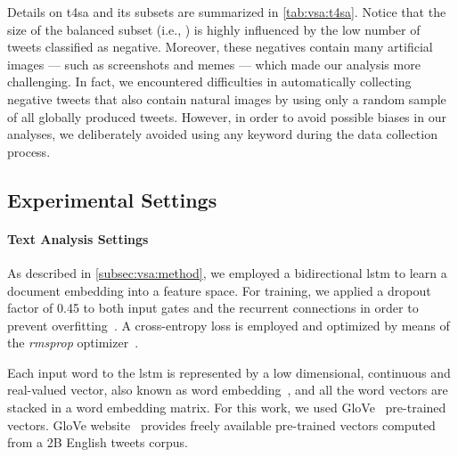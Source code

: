 Details on \gls{t4sa} and its subsets are summarized in \ref{tab:vsa:t4sa}.
Notice that the size of the balanced subset (i.e., {\BTSA}) is highly influenced by the low number of tweets classified as negative.
Moreover, these negatives contain many artificial images --- such as screenshots and memes --- which made our analysis more challenging.
In fact, we encountered difficulties in automatically collecting negative tweets that also contain natural images by using only a random sample of all globally produced tweets.
However, in order to avoid possible biases in our analyses, we deliberately avoided using any keyword during the data collection process.

\subsection{Experimental Settings}
\label{exp:visual}

\paragraph{Text Analysis Settings}
As described in \ref{subsec:vsa:method}, we employed a bidirectional \gls{lstm} to learn a document embedding into a feature space.
For training, we applied a dropout factor of 0.45 to both input gates and the recurrent connections in order to prevent  overfitting~\cite{gal2016theoretically}.
A cross-entropy loss is employed and optimized by means of the \emph{rmsprop} optimizer~\cite{tieleman2012lecture}.

Each input word to the \gls{lstm} is represented by a low dimensional, continuous and real-valued vector, also known as word embedding~\cite{mikolov2013distributed}, and all the word vectors are stacked in a word embedding matrix.
For this work, we used GloVe~\cite{pennington2014glove} pre-trained vectors. %
GloVe website~ provides freely available pre-trained vectors computed from a 2B English tweets corpus.

